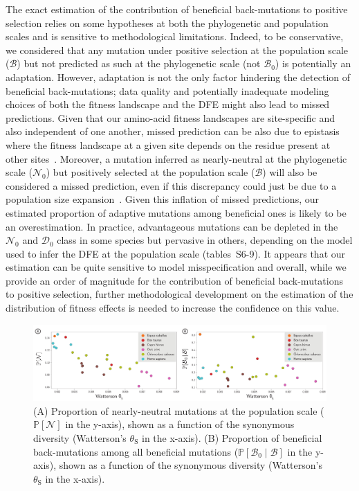 \documentclass[12pt]{article}
\newcommand{\proba}{\mathbb{P}}
\newcommand{\SphyDel}{\mathcal{D}_0}
\newcommand{\SphyNeu}{\mathcal{N}_0}
\newcommand{\SphyBen}{\mathcal{B}_0}
\newcommand{\given}{\mid}
\newcommand{\SpopNeu}{\mathcal{N}}
\newcommand{\SpopBen}{\mathcal{B}}
\newcommand{\thetaSyn}{\theta_{\text{S}}}
\begin{document}
The exact estimation of the contribution of beneficial back-mutations to positive selection relies on some hypotheses at both the phylogenetic and population scales and is sensitive to methodological limitations.
Indeed, to be conservative, we considered that any mutation under positive selection at the population scale ($\SpopBen$) but not predicted as such at the phylogenetic scale (not $\SphyBen$) is potentially an adaptation.
However, adaptation is not the only factor hindering the detection of beneficial back-mutations; data quality and potentially inadequate modeling choices of both the fitness landscape and the DFE might also lead to missed predictions.
Given that our amino-acid fitness landscapes are site-specific and also independent of one another, missed prediction can be also due to epistasis where the fitness landscape at a given site depends on the residue present at other sites~\cite{starr_epistasis_2016, park_epistatic_2022}.
Moreover, a mutation inferred as nearly-neutral at the phylogenetic scale ($\SphyNeu$) but positively selected at the population scale ($\SpopBen$) will also be considered a missed prediction, even if this discrepancy could just be due to a population size expansion~\cite{lanfear_population_2014, jones_shifting_2017, platt_protein_2018}.
Given this inflation of missed predictions, our estimated proportion of adaptive mutations among beneficial ones is likely to be an overestimation.
In practice, advantageous mutations can be depleted in the $\SphyNeu$ and $\SphyDel$ class in some species but pervasive in others, depending on the model used to infer the DFE at the population scale (tables~S6-9).
It appears that our estimation can be quite sensitive to model misspecification and overall, while we provide an order of magnitude for the contribution of beneficial back-mutations to positive selection, further methodological development on the estimation of the distribution of fitness effects is needed to increase the confidence on this value.


\begin{figure}[!ht]
    \centering
    \includegraphics[width=\textwidth, page=1] {artworks/figure.diversity}
    \caption{
        (A) Proportion of nearly-neutral mutations at the population scale ($\proba [ \SpopNeu]$ in the y-axis), shown as a function of the synonymous diversity (Watterson's $\thetaSyn$ in the x-axis).
        (B) Proportion of beneficial back-mutations among all beneficial mutations ($\proba [ \SphyBen  \given  \SpopBen]$ in the y-axis), shown as a function of the synonymous diversity (Watterson's $\thetaSyn$ in the x-axis).
    }
    \label{fig:diversity}
\end{figure}
\end{document}
